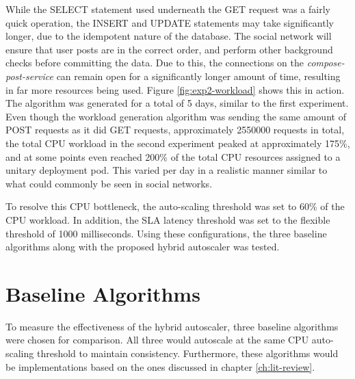 While the SELECT statement used underneath the GET request was a fairly quick operation, the INSERT and UPDATE statements may take significantly longer, due to the idempotent nature of the database. The social network will ensure that user posts are in the correct order, and perform other background checks before committing the data. Due to this, the connections on the \textit{compose-post-service} can remain open for a significantly longer amount of time, resulting in far more resources being used. Figure \ref{fig:exp2-workload} shows this in action. The algorithm was generated for a total of 5 days, similar to the first experiment. Even though the workload generation algorithm was sending the same amount of POST requests as it did GET requests, approximately \num[group-separator={,}]{2550000} requests in total, the total CPU workload in the second experiment peaked at approximately 175\%, and at some points even reached 200\% of the total CPU resources assigned to a unitary deployment pod. This varied per day in a realistic manner similar to what could commonly be seen in social networks.\par

To resolve this CPU bottleneck, the auto-scaling threshold was set to 60\% of the CPU workload. In addition, the SLA latency threshold was set to the flexible threshold of 1000 milliseconds. Using these configurations, the three baseline algorithms along with the proposed hybrid autoscaler was tested.\par

\section{Baseline Algorithms}
\label{sec:ch6-baseline-algos}

To measure the effectiveness of the hybrid autoscaler, three baseline algorithms were chosen for comparison. All three would autoscale at the same CPU auto-scaling threshold to maintain consistency. Furthermore, these algorithms would be implementations based on the ones discussed in chapter \ref{ch:lit-review}.\par


